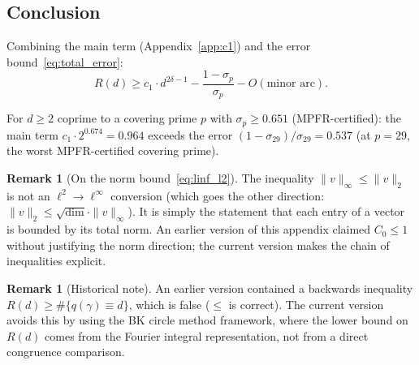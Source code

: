 \documentclass[11pt,a4paper]{amsart}
\theoremstyle{definition}
\newtheorem{remark}[theorem]{Remark}
\begin{document}
\subsection{Conclusion}

Combining the main term (Appendix~\ref{app:c1}) and the error bound~\eqref{eq:total_error}:
\[
R(d) \geq c_1 \cdot d^{2\delta - 1} - \frac{1 - \sigma_p}{\sigma_p} - O(\text{minor arc}).
\]

For $d \geq 2$ coprime to a covering prime $p$ with $\sigma_p \geq 0.651$ (MPFR-certified): the main term $c_1 \cdot 2^{0.674} = 0.964$ exceeds the error $(1-\sigma_{29})/\sigma_{29} = 0.537$ (at $p = 29$, the worst MPFR-certified covering prime).

\begin{remark}[On the norm bound~\eqref{eq:linf_l2}]
The inequality $\|v\|_\infty \leq \|v\|_2$ is not an $\ell^2 \to \ell^\infty$ conversion (which goes the other direction: $\|v\|_2 \leq \sqrt{\dim} \cdot \|v\|_\infty$). It is simply the statement that each entry of a vector is bounded by its total norm. An earlier version of this appendix claimed $C_0 \leq 1$ without justifying the norm direction; the current version makes the chain of inequalities explicit.
\end{remark}

\begin{remark}[Historical note]
An earlier version contained a backwards inequality $R(d) \geq \#\{q(\gamma) \equiv d\}$, which is false ($\leq$ is correct). The current version avoids this by using the BK circle method framework, where the lower bound on $R(d)$ comes from the Fourier integral representation, not from a direct congruence comparison.
\end{remark}
\end{document}
